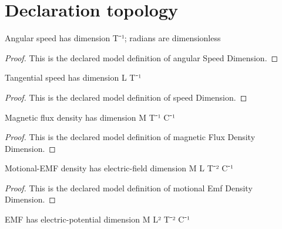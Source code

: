 \section{Declaration topology}
\begin{definition}
  \label{def:physics:phyx-mini-0920:phyxminiproblems-problemphyxmini0920-angularspeeddimension}
  Angular speed has dimension T⁻¹; radians are dimensionless
\end{definition}
\begin{proof}
  This is the declared model definition of angular Speed Dimension.
\end{proof}
\begin{definition}
  \label{def:physics:phyx-mini-0920:phyxminiproblems-problemphyxmini0920-speeddimension}
  Tangential speed has dimension L T⁻¹
\end{definition}
\begin{proof}
  This is the declared model definition of speed Dimension.
\end{proof}
\begin{definition}
  \label{def:physics:phyx-mini-0920:phyxminiproblems-problemphyxmini0920-magneticfluxdensitydimension}
  Magnetic flux density has dimension M T⁻¹ C⁻¹
\end{definition}
\begin{proof}
  This is the declared model definition of magnetic Flux Density Dimension.
\end{proof}
\begin{definition}
  \label{def:physics:phyx-mini-0920:phyxminiproblems-problemphyxmini0920-motionalemfdensitydimension}
  Motional-EMF density has electric-field dimension M L T⁻² C⁻¹
\end{definition}
\begin{proof}
  This is the declared model definition of motional Emf Density Dimension.
\end{proof}
\begin{definition}
  \label{def:physics:phyx-mini-0920:phyxminiproblems-problemphyxmini0920-emfdimension}
  EMF has electric-potential dimension M L² T⁻² C⁻¹
\end{definition}
